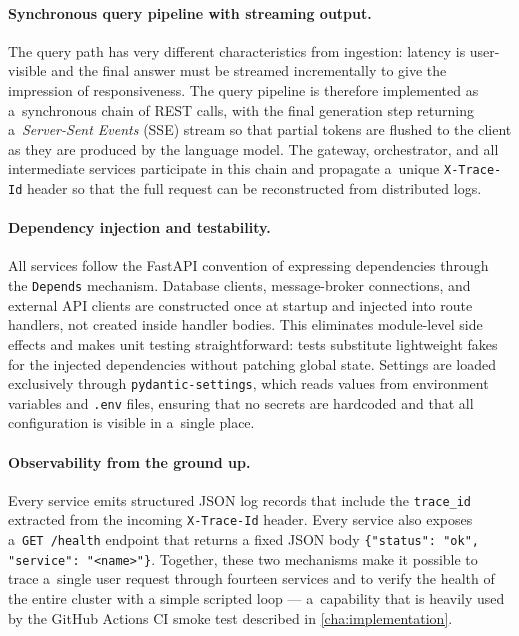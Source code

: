 \paragraph{Synchronous query pipeline with streaming output.}
The query path has very different characteristics from ingestion: latency
is user-visible and the final answer must be streamed incrementally to give
the impression of responsiveness.  The query pipeline is therefore
implemented as a~synchronous chain of REST calls, with the final generation
step returning a~\emph{Server-Sent Events} (SSE) stream so that partial
tokens are flushed to the client as they are produced by the language model.
The gateway, orchestrator, and all intermediate services participate in this
chain and propagate a~unique \texttt{X-Trace-Id} header so that the full
request can be reconstructed from distributed logs.

\paragraph{Dependency injection and testability.}
All services follow the FastAPI convention of expressing dependencies
through the \texttt{Depends} mechanism.  Database clients, message-broker
connections, and external API clients are constructed once at startup and
injected into route handlers, not created inside handler bodies.  This
eliminates module-level side effects and makes unit testing straightforward:
tests substitute lightweight fakes for the injected dependencies without
patching global state.  Settings are loaded exclusively through
\texttt{pydantic-settings}, which reads values from environment variables
and \texttt{.env} files, ensuring that no secrets are hardcoded and that
all configuration is visible in a~single place.

\paragraph{Observability from the ground up.}
Every service emits structured JSON log records that include the
\texttt{trace\_id} extracted from the incoming \texttt{X-Trace-Id} header.
Every service also exposes a~\texttt{GET /health} endpoint that returns a
fixed JSON body \texttt{\{"status": "ok", "service": "<name>"\}}.  Together,
these two mechanisms make it possible to trace a~single user request through
fourteen services and to verify the health of the entire cluster with a
simple scripted loop --- a~capability that is heavily used by the
GitHub Actions CI smoke test described in \cref{cha:implementation}.

